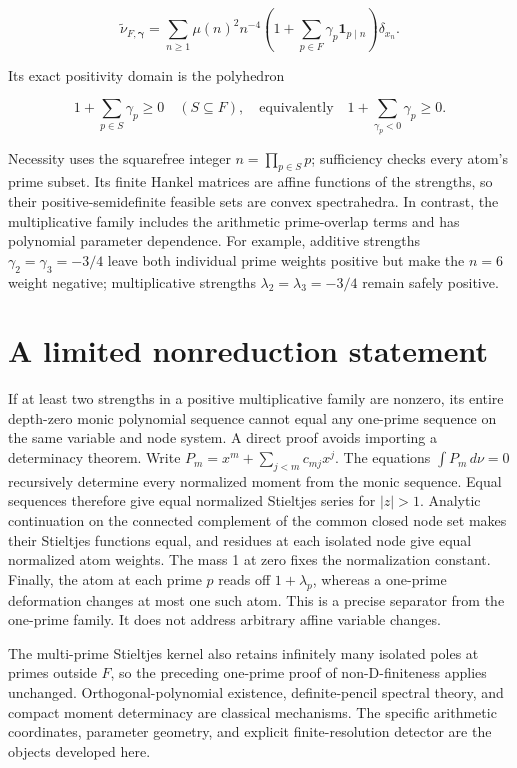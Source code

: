 \[
\widetilde\nu_{F,\boldsymbol\gamma}
=\sum_{n\ge1}\mu(n)^2n^{-4}
\left(1+\sum_{p\in F}\gamma_p\mathbf1_{p\mid n}\right)\delta_{x_n}.
\]

Its exact positivity domain is the polyhedron

\[
1+\sum_{p\in S}\gamma_p\ge0\quad(S\subseteq F),
\quad\text{equivalently}\quad
1+\sum_{\gamma_p<0}\gamma_p\ge0.
\]

Necessity uses the squarefree integer \(n=\prod_{p\in S}p\); sufficiency
checks every atom's prime subset. Its finite Hankel matrices are affine
functions of the strengths, so their positive-semidefinite feasible sets
are convex spectrahedra. In contrast, the multiplicative family includes
the arithmetic prime-overlap terms and has polynomial parameter
dependence. For example, additive strengths \(\gamma_2=\gamma_3=-3/4\)
leave both individual prime weights positive but make the \(n=6\) weight
negative; multiplicative strengths \(\lambda_2=\lambda_3=-3/4\) remain
safely positive.

\hypertarget{a-limited-nonreduction-statement}{%
\section{A limited nonreduction
statement}\label{a-limited-nonreduction-statement}}

If at least two strengths in a positive multiplicative family are
nonzero, its entire depth-zero monic polynomial sequence cannot equal
any one-prime sequence on the same variable and node system. A direct
proof avoids importing a determinacy theorem. Write
\(P_m=x^m+\sum_{j<m}c_{mj}x^j\). The equations \(\int P_m\,d\nu=0\)
recursively determine every normalized moment from the monic sequence.
Equal sequences therefore give equal normalized Stieltjes series for
\(|z|>1\). Analytic continuation on the connected complement of the
common closed node set makes their Stieltjes functions equal, and
residues at each isolated node give equal normalized atom weights. The
mass 1 at zero fixes the normalization constant. Finally, the atom at
each prime \(p\) reads off \(1+\lambda_p\), whereas a one-prime
deformation changes at most one such atom. This is a precise separator
from the one-prime family. It
does not address arbitrary affine variable changes.

The multi-prime Stieltjes kernel also retains infinitely many isolated
poles at primes outside \(F\), so the preceding one-prime proof of
non-D-finiteness applies unchanged. Orthogonal-polynomial existence,
definite-pencil spectral theory, and compact moment determinacy are
classical mechanisms. The specific arithmetic coordinates, parameter
geometry, and explicit finite-resolution detector are the objects
developed here.


